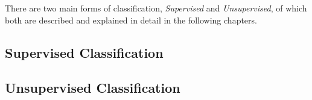 There are two main forms of classification, \textit{Supervised} and \textit{Unsupervised}, of which both are described and explained in detail in the following chapters.


\subsection{Supervised Classification}

\subsection{Unsupervised Classification}
